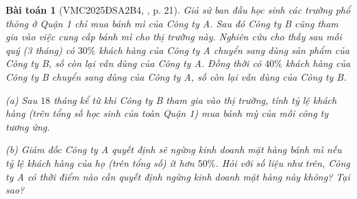 \documentclass{article}
\newtheorem{baitoan}{Bài toán}
\begin{document}
\begin{baitoan}[VMC2025ĐSA2B4, \cite{VMS_VMC2025}, p. 21]
	Giả sử ban đầu học sinh các trường phổ thông ở Quận 1 chỉ mua bánh mì của Công ty A. Sau đó Công ty B cũng tham gia vào việc cung cấp bánh mì cho thị trường này. Nghiên cứu cho thấy sau mỗi quý (3 tháng) có $30\%$ khách hàng của Công ty A chuyển sang dùng sản phẩm của Công ty B, số còn lại vẫn dùng của Công ty A. Đồng thời có $40\%$ khách hàng của Công ty B chuyển sang dùng của Công ty A, số còn lại vẫn dùng của Công ty B.
	\item(a) Sau $18$ tháng kể từ khi Công ty B tham gia vào thị trường, tính tỷ lệ khách hàng (trên tổng số học sinh của toàn Quận 1) mua bánh mỳ của mỗi công ty tương ứng.
	\item(b) Giám đốc Công ty A quyết định sẽ ngừng kinh doanh mặt hàng bánh mì nếu tỷ lệ khách hàng của họ (trên tổng số) ít hơn $50\%$. Hỏi với số liệu như trên, Công ty A có thời điểm nào cần quyết định ngừng kinh doanh mặt hàng này không? Tại sao?
\end{baitoan}
\end{document}
